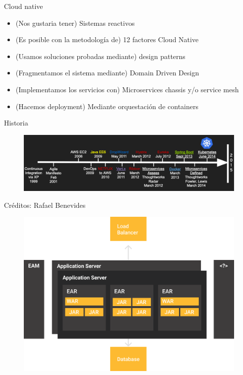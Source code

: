 \documentclass[aspectratio=169]{beamer}
\begin{document}
\begin{frame}{Cloud native}

	\begin{itemize}
		\item (Nos gustaria tener) Sistemas reactivos
		\item (Es posible con la metodología de) 12 factores Cloud Native
        \item (Usamos soluciones probadas mediante) design patterns
        \item (Fragmentamos el sistema mediante) Domain Driven Design
		\item (Implementamos los servicios con) Microservices chassis y/o service mesh
        \item (Hacemos deployment) Mediante orquestación de containers
	\end{itemize}


\end{frame}


\begin{frame}{Historia}

\begin{figure}
	\centering
	\includegraphics[width=\linewidth]{Images/timeline}
\end{figure}
Créditos: Rafael Benevides

\end{frame}


\begin{frame}{}

\begin{figure}
	\centering
	\includegraphics[width=0.7\linewidth]{Images/monolitos.png}
\end{figure}
\end{frame}
\end{document}
